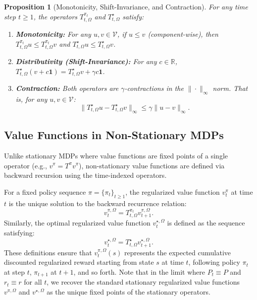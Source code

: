 \documentclass{article}
\theoremstyle{plain}
\newtheorem{proposition}[theorem]{Proposition}
\theoremstyle{definition}
\theoremstyle{remark}
\newcommand{\1}{\mathbbm{1}}
\newcommand{\R}{\mathbb{R}}
\newcommand{\infnorm}[1]{\| #1 \|_\infty}
\newcommand{\T}{T}
\newcommand{\Tpi}[2]{T^{\pi_{#1}}_{#1, \Omega}} %
\newcommand{\Tstar}[1]{T^{\star}_{#1, \Omega}} %
\begin{document}
\begin{proposition}[Monotonicity, Shift-Invariance, and Contraction]
\label{prop:properties}
For any time step $t \ge 1$, the operators $\Tpi{t}{}$ and $\Tstar{t}$ satisfy:
\begin{enumerate}
    \item \textbf{Monotonicity:} For any $u, v \in \mathcal{V}$, if $u \le v$ (component-wise), then $\Tpi{t}{} u \le \Tpi{t}{} v$ and $\Tstar{t} u \le \Tstar{t} v$.
    \item \textbf{Distributivity (Shift-Invariance):} For any $c \in \R$, $\Tstar{t}(v + c\mathbf{1}) = \Tstar{t} v + \gamma c\mathbf{1}$.
    \item \textbf{Contraction:} Both operators are $\gamma$-contractions in the $\infnorm{\cdot}$ norm. That is, for any $u, v \in \mathcal{V}$:
    \begin{equation}
        \infnorm{\Tstar{t} u - \Tstar{t} v} \le \gamma \infnorm{u - v}.
    \end{equation}
\end{enumerate}
\end{proposition}

\subsection{Value Functions in Non-Stationary MDPs}
Unlike stationary MDPs where value functions are fixed points of a single operator (e.g., $v^\pi = \T^\pi v^\pi$), non-stationary value functions are defined via backward recursion using the time-indexed operators.

For a fixed policy sequence $\pi = \{\pi_t\}_{t \ge 1}$, the regularized value function $v^\pi_t$ at time $t$ is the unique solution to the backward recurrence relation:
\begin{equation}
    v^{\pi, \Omega}_t = \Tpi{t}{} v^{\pi, \Omega}_{t+1}.
\end{equation}
Similarly, the optimal regularized value function $v^{\star, \Omega}_t$ is defined as the sequence satisfying:
\begin{equation}
    v^{\star, \Omega}_t = \Tstar{t} v^{\star, \Omega}_{t+1}.
\end{equation}
These definitions ensure that $v^{\pi, \Omega}_t(s)$ represents the expected cumulative discounted regularized reward starting from state $s$ at time $t$, following policy $\pi_t$ at step $t$, $\pi_{t+1}$ at $t+1$, and so forth. Note that in the limit where $P_t \equiv P$ and $r_t \equiv r$ for all $t$, we recover the standard stationary regularized value functions $v^{\pi, \Omega}$ and $v^{\star, \Omega}$ as the unique fixed points of the stationary operators.
\end{document}
